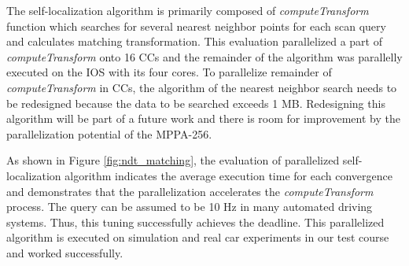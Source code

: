 \documentclass[conference,compsoc]{IEEEtran}
\begin{document}
The self-localization algorithm is primarily composed of \emph{computeTransform} function which searches for several nearest neighbor points for each scan query and calculates matching transformation.
This evaluation parallelized a part of \emph{computeTransform} onto 16 CCs and the remainder of the algorithm was parallelly executed on the IOS with its four cores.
To parallelize remainder of \emph{computeTransform} in CCs, the algorithm of the nearest neighbor search needs to be redesigned because the data to be searched exceeds 1 MB.
Redesigning this algorithm will be part of a future work and there is room for improvement by the parallelization potential of the MPPA-256.

As shown in Figure \ref{fig:ndt_matching}, the evaluation of parallelized self-localization algorithm indicates the average execution time for each convergence and demonstrates that the parallelization accelerates the \emph{computeTransform} process.
The query can be assumed to be 10 Hz in many automated driving systems.
Thus, this tuning successfully achieves the deadline.
This parallelized algorithm is executed on simulation and real car experiments in our test course and worked successfully.

\end{document}
